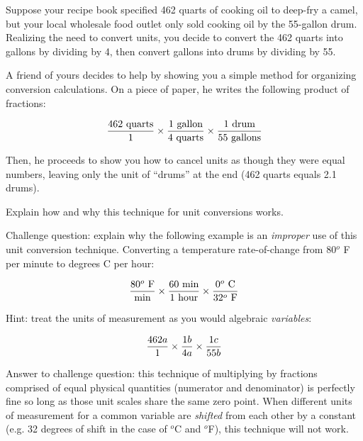 

Suppose your recipe book specified 462 quarts of cooking oil to deep-fry a camel, but your local wholesale food outlet only sold cooking oil by the 55-gallon drum.  Realizing the need to convert units, you decide to convert the 462 quarts into gallons by dividing by 4, then convert gallons into drums by dividing by 55.

A friend of yours decides to help by showing you a simple method for organizing conversion calculations.  On a piece of paper, he writes the following product of fractions:

$${462 \hbox{ quarts} \over 1}  \times  {1 \hbox{ gallon} \over 4 \hbox{ quarts}}  \times  {1 \hbox{ drum} \over 55 \hbox{ gallons}}$$

Then, he proceeds to show you how to cancel units as though they were equal numbers, leaving only the unit of ``drums'' at the end (462 quarts equals 2.1 drums).

Explain how and why this technique for unit conversions works.

\vskip 10pt

Challenge question: explain why the following example is an {\it improper} use of this unit conversion technique.  Converting a temperature rate-of-change from 80$^{o}$ F per minute to degrees C per hour:

$${80^{o} \hbox{ F} \over \hbox{min}} \times {60 \hbox{ min} \over 1 \hbox{ hour}} \times {0^{o} \hbox{ C} \over 32^{o} \hbox{ F}}$$







Hint: treat the units of measurement as you would algebraic {\it variables}:

$${462a \over 1}  \times  {1b \over 4a}  \times  {1c \over 55b}$$

\vskip 10pt

Answer to challenge question: this technique of multiplying by fractions comprised of equal physical quantities (numerator and denominator) is perfectly fine so long as those unit scales share the same zero point.  When different units of measurement for a common variable are {\it shifted} from each other by a constant (e.g. 32 degrees of shift in the case of $^{o}$C and $^{o}$F), this technique will not work.

